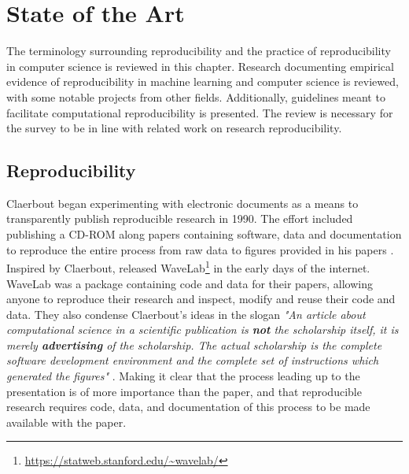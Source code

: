 \chapter{State of the Art} \label{chap:related-work}

The terminology surrounding reproducibility and the practice of reproducibility in computer science is reviewed in this chapter. Research documenting empirical evidence of reproducibility in machine learning and computer science is reviewed, with some notable projects from other fields. Additionally, guidelines meant to facilitate computational reproducibility is presented. The review is necessary for the survey to be in line with related work on research reproducibility.

\section{Reproducibility} \label{sec:reproducibility}
Claerbout began experimenting with electronic documents as a means to transparently publish reproducible research in 1990. The effort included publishing a CD-ROM along papers containing software, data and documentation to reproduce the entire process from raw data to figures provided in his papers \citep{Claerbout1992}. Inspired by Claerbout, \cite{Buckheit1995} released WaveLab\footnote{\url{https://statweb.stanford.edu/~wavelab/}} in the early days of the internet. WaveLab was a package containing code and data for their papers, allowing anyone to reproduce their research and inspect, modify and reuse their code and data. They also condense Claerbout's ideas in the slogan \emph{"An article about computational science in a scientific publication is \textbf{not} the scholarship itself, it is merely \textbf{advertising} of the scholarship. The actual scholarship is the complete software development environment and the complete set of instructions which generated the figures"} \citep{Buckheit1995}. Making it clear that the process leading up to the presentation is of more importance than the paper, and that reproducible research requires code, data, and documentation of this process to be made available with the paper.

